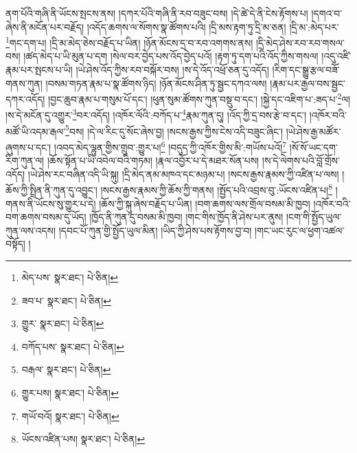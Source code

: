 ནག་པོའི་གཞི་ནི་ཡོངས་སྤངས་ནས། །དཀར་པོའི་གཞི་ནི་རབ་བཟུང་བས། །དེ་ཚེ་དེ་ནི་ངེས་རྟོགས་པ། །དགའ་བ་ཞེས་ནི་མངོན་པར་བརྗོད། །འདོད་ཆགས་ལ་སོགས་སྣ་ཚོགས་པའི། །དྲི་མས་རྟག་ཏུ་དྲི་མ་ཅན། །དྲི་མ་:མེད་པར་\footnote{མེད་པས་  སྣར་ཐང་།  པེ་ཅིན། }གང་དག་པ། །དྲི་མ་མེད་ཅེས་བརྗོད་པ་ཡིན། །ཉོན་མོངས་དྲ་བ་རབ་འགགས་ནས། །དྲི་མེད་ཤེས་རབ་རབ་གསལ་བས། །ཚད་མེད་པ་ཡི་མུན་པ་དག །སེལ་བར་བྱེད་པས་འོད་བྱེད་པའོ། །རྟག་ཏུ་དག་པའི་འོད་ཀྱིས་གསལ། །འདུ་འཛི་རྣམ་པར་སྤངས་པ་ཡི། །ཡེ་ཤེས་འོད་ཀྱིས་རབ་བསྐོར་བས། །ས་དེ་འོད་འཕྲོ་ཅན་དུ་འདོད། །རིག་དང་སྒྱུ་རྩལ་བཟོ་གནས་ཀུན། །བསམ་གཏན་རྣམ་པ་སྣ་ཚོགས་ཉིད། །ཉོན་མོངས་ཤིན་ཏུ་སྦྱང་དཀའ་ལས། །རྣམ་པར་རྒྱལ་བས་སྦྱང་དཀར་འདོད། །བྱང་ཆུབ་རྣམ་པ་གསུམ་པོ་དང་། །ཕུན་སུམ་ཚོགས་ཀུན་བསྡུ་བ་དང་། །སྐྱེ་དང་འཇིག་པ་:ཟད་པ་\footnote{ཟབ་པ་  སྣར་ཐང་།  པེ་ཅིན། }ལ། །ས་དེ་མངོན་དུ་འགྱུར་\footnote{གྱུར་  སྣར་ཐང་།  པེ་ཅིན། }བར་འདོད། །འཁོར་ལོའི་:བཀོད་པ་\footnote{བཀོད་པས་  སྣར་ཐང་།  པེ་ཅིན། }རྣམ་ཀུན་དུ། །འོད་ཀྱི་དྲ་བས་རྩེ་བ་དང་། །འཁོར་བའི་མཚོ་ཡི་འདམ་རྒལ་\footnote{བརྒལ་  སྣར་ཐང་།  པེ་ཅིན། }བས། །དེ་ལ་རིང་དུ་སོང་ཞེས་བྱ། །སངས་རྒྱས་ཀྱིས་ངེས་འདི་བཟུང་ཞིང་། །ཡེ་ཤེས་རྒྱ་མཚོར་ཞུགས་པ་དང་། །འབད་མེད་ལྷུན་གྱིས་གྲུབ་:གྱུར་པ།\footnote{གྱུར་པས།  སྣར་ཐང་།  པེ་ཅིན། } །བདུད་ཀྱི་འཁོར་གྱིས་མི་:གཡོས་པའོ།\footnote{གཡོ་བའོ།  སྣར་ཐང་།  པེ་ཅིན། } །སོ་སོ་ཡང་དག་རིག་ཀུན་ལ། །ཆོས་སྟོན་པ་ཡི་འབེལ་བའི་གཏམ། །རྣལ་འབྱོར་པ་དེ་མཐར་སོན་པས། །ས་དེ་ལེགས་པའི་བློ་གྲོས་འདོད། །ཡེ་ཤེས་རང་བཞིན་འདི་ཡི་སྐུ། །དྲི་མེད་ནམ་མཁའ་དང་མཉམ་པ། །སངས་རྒྱས་རྣམས་ཀྱི་འཛིན་པ་ལས། །ཆོས་ཀྱི་སྤྲིན་ནི་ཀུན་དུ་འབྱུང་། །སངས་རྒྱས་རྣམས་ཀྱི་ཆོས་ཀྱི་གནས། །སྤྱོད་པའི་འབྲས་བུ་:ཡོངས་འཛིན་པ།\footnote{ཡོངས་འཛིན་པས།  སྣར་ཐང་།  པེ་ཅིན། } །གནས་ནི་ཡོངས་སུ་གྱུར་པ་དེ། །ཆོས་ཀྱི་སྐུ་ཞེས་བརྗོད་པ་ཡིན། །བག་ཆགས་ལས་གྲོལ་བསམ་མི་ཁྱབ། །འཁོར་བའི་བག་ཆགས་བསམ་དུ་ཡོད། །ཁྱོད་ནི་ཀུན་དུ་བསམ་མི་ཁྱབ། །གང་གིས་ཁྱོད་ནི་ཤེས་པར་ནུས། །ངག་གི་སྤྱོད་ཡུལ་ཀུན་ལས་འདས། །དབང་པོ་ཀུན་གྱི་སྤྱོད་ཡུལ་མིན། །ཡིད་ཀྱི་ཤེས་པས་རྟོགས་བྱ་བ། །གང་ཡང་རུང་ལ་ཕྱག་འཚལ་བསྟོད། །
